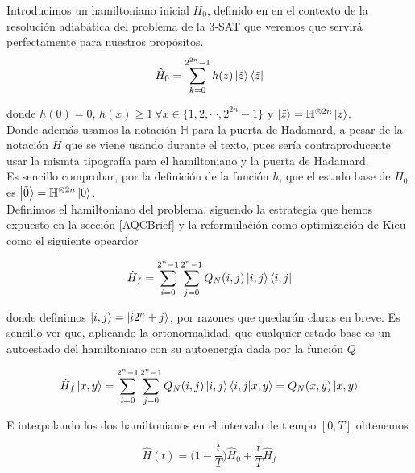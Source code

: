 \documentclass[11pt, spanish]{report}
\numberwithin{equation}{section}
\numberwithin{defin}{section}
\begin{document}
Introducimos un hamiltoniano inicial $H_0$, definido en \cite{2002quant.ph..6003V} en el contexto de la resolución adiabática del problema de la 3-SAT que veremos que servirá perfectamente para nuestros propósitos.\\

\begin{equation}
\hat{H}_0=\sum_{k=0}^{2^{2n}-1}h(z)\ket{\tilde{z}}\bra{\tilde{z}}
\end{equation}

donde $h(0)=0$, $h(x)\geq 1\ \forall x\in\{1,2,\cdots,2^{2n}-1\}$ y $\ket{\tilde{z}}=\mathbb{H}^{\otimes 2n}\ket{z}$.\\

Donde además usamos la notación $\mathbb{H}$ para la puerta de Hadamard, a pesar de la notación $H$ que se viene usando durante el texto, pues sería contraproducente usar la mismta tipografía para el hamiltoniano y la puerta de Hadamard.\\

Es sencillo comprobar, por la definición de la función $h$, que el estado base de $H_0$ es $\ket{\tilde{0}}=\mathbb{H}^{\otimes 2n}\ket{0}$.\\

Definimos el hamiltoniano del problema, siguendo la estrategia que hemos expuesto en la sección \ref{AQCBrief} y la reformulación como optimización de Kieu \cite{2018arXiv180802781K} como el siguiente opeardor

\begin{equation}
\hat{H}_f=\sum_{i=0}^{2^n-1}\sum_{j=0}^{2^n-1}Q_N(i,j)\ket{i,j}\bra{i,j}
\end{equation}

\noindent donde definimos $\ket{i,j}=\ket{i2^n+j}$, por razones que quedarán claras en breve. Es sencillo ver que, aplicando la ortonormalidad, que cualquier estado base es un autoestado del hamiltoniano con su autoenergía dada por la función $Q$

\begin{equation}
\hat{H}_f\ket{x,y}=\sum_{i=0}^{2^n-1}\sum_{j=0}^{2^n-1}Q_N(i,j)\ket{i,j}\bra{i,j}\ket{x,y}=Q_N(x,y)\ket{x,y}
\end{equation}

E interpolando los dos hamiltonianos en el intervalo de tiempo $[0,T]$ obtenemos

\begin{equation}\label{myEqInterpo}
\hat{H}(t)=\Big(1-\frac{t}{T}\Big)\hat{H}_0+\frac{t}{T}\hat{H}_f
\end{equation}
\end{document}
